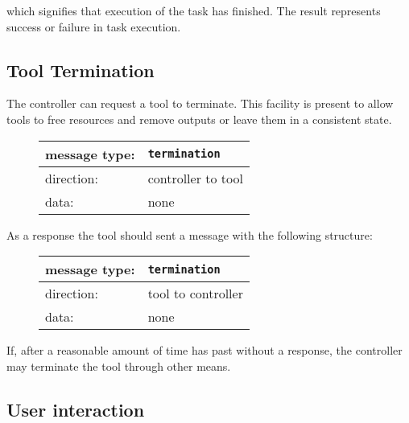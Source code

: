 \documentclass{article}
\newcommand{\msg}[1]{\texttt{#1}}
\begin{document}
   \noindent which signifies that execution of the task has finished. The
   result represents success or failure in task execution.

  \subsection{Tool Termination}

   \noindent The controller can request a tool to terminate. This facility is
   present to allow tools to free resources and remove outputs or leave
   them in a consistent state.

   \begin{figure}[H]
    \begin{center}
     \begin{tabular}{|ll|}
      \hline
       message type:    & \msg{termination} \\
      \hline
       direction:       & controller to tool \\
       data:            & none \\
      \hline
     \end{tabular}
    \end{center}
   \end{figure}

   \noindent As a response the tool should sent a message with the following
   structure:

   \begin{figure}[H]
    \begin{center}
     \begin{tabular}{|ll|}
      \hline
       message type:   & \msg{termination} \\
      \hline
       direction:      & tool to controller \\
       data:           & none \\
      \hline
     \end{tabular}
    \end{center}
   \end{figure}

   If, after a reasonable amount of time has past without a response, the
   controller may terminate the tool through other means.

  \pagebreak

  \subsection{User interaction} \label{ss:user_interaction}
\end{document}
